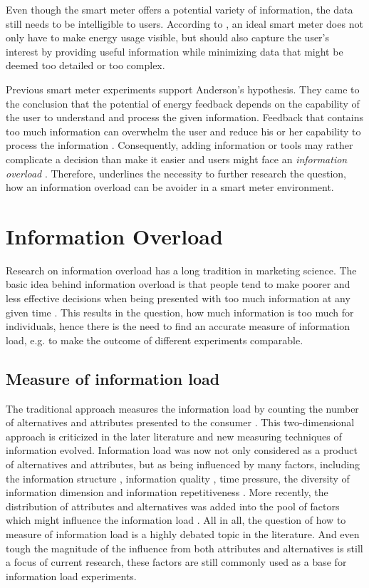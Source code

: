 Even though the smart meter offers a potential variety of information, the data still needs to be intelligible to users. According to \cite{WillAnderson2009}, an ideal smart meter does not only have to make energy usage visible, but should also capture the user's interest by providing useful information while minimizing data that might be deemed too detailed or too complex.

Previous smart meter experiments support Anderson's hypothesis. They came to the conclusion that the potential of energy feedback depends on the capability of the user to understand and process the given information.
Feedback that contains too much information can overwhelm the user and reduce his or her capability to process the information \citep{Henryson2000}. Consequently,  adding information or tools may rather complicate a decision than make it easier \citep{Darby2006} and users might face an \textit{information overload} \citep{Fischer2008}. Therefore, \cite{WillAnderson2009} underlines the necessity to further research the question, how an information overload can be avoider in a smart meter environment.

\section{Information Overload}
\label{ch:Literature Review:sec:Information Overload}

Research on information overload has a long tradition in marketing science.
The basic idea behind information overload is that people tend to make poorer and less effective decisions when being presented with too much information at any given time \citep{Siegfried1965}. 
This results in the question, how much information is too much for individuals, hence there is the need to find an accurate measure of information load, e.g. to make the outcome of different experiments comparable.
\subsection{Measure of information load}
The traditional approach measures the information load by counting the number of alternatives and attributes presented to the consumer \citep{Chen2009}. This two-dimensional approach is criticized in the later literature and new measuring techniques of information evolved. Information load was now not only considered as a product of alternatives and attributes, but as being influenced by many factors, including the information structure \citep{Lurie2004}, information quality \citep{Keller1987}, time pressure, the diversity of information dimension \citep{Payne1982} and information repetitiveness \citep{Hwang1999}.
More recently, the distribution of attributes and alternatives was added into the pool of factors which might influence the information load \citep{Lurie2004}. 
All in all, the question of how to measure of information load is a highly debated topic in the literature. And even tough the magnitude of the influence from both attributes and alternatives is still a focus of current research, these factors are still commonly used as a base for information load experiments.

